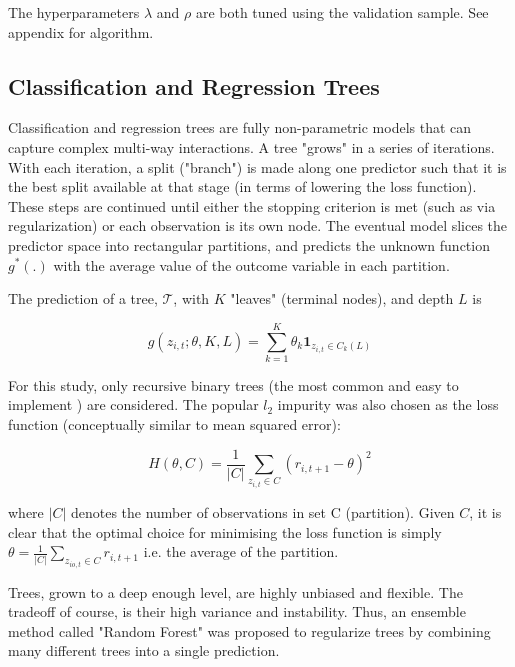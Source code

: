 \documentclass[man, a4paper, biblatex]{article}
\newcommand{\smalltodo}[2][] {\todo[caption={#2}, size=\scriptsize,%
	fancyline,#1]{\begin{spacing}{.5}#2\end{spacing}}}
\newcommand{\rhs}[2][]{\smalltodo[color=green!30,#1]{{\bf RS:} #2}}
\begin{document}
The hyperparameters $\lambda$ and $\rho$ are both tuned using the validation sample. See appendix for algorithm.

\rhs{update when algorithm is written}

\subsection{Classification and Regression Trees}

Classification and regression trees are fully non-parametric models that can capture complex multi-way interactions. A tree "grows" in a series of iterations. With each iteration, a split ("branch") is made along one predictor such that it is the best split available at that stage (in terms of lowering the loss function). These steps are continued until either the stopping criterion is met (such as via regularization) or each observation is its own node. The eventual model slices the predictor space into rectangular partitions, and predicts the unknown function $g^*(.)$ with the average value of the outcome variable in each partition.

The prediction of a tree, $\mathcal{T}$, with \(K\) "leaves" (terminal nodes), and depth $L$ is

\begin{equation}
	g(z_{i,t};\theta,K,L) = \sum_{k=1}^{K}\theta_k\textbf{1}_{z_{i,t}\in C_k(L)}
\end{equation}

For this study, only recursive binary trees (the most common and easy to implement ) are considered. The popular $l_2$ impurity was also chosen as the loss function (conceptually similar to mean squared error):

\begin{equation}
	H(\theta, C) = \frac{1}{|C|} \sum_{z_{i,t} \in C} (r_{i,t+1} - \theta)^2
\end{equation}

where $|C|$ denotes the number of observations in set C (partition). Given $C$, it is clear that the optimal choice for minimising the loss function is simply $\theta = \frac{1}{|C|} \sum_{z_{io,t}\in C}^{ }r_{i,t+1}$ i.e. the average of the partition.

Trees, grown to a deep enough level, are highly unbiased and flexible. The tradeoff of course, is their high variance and instability. Thus, an ensemble method called "Random Forest" was proposed to regularize trees by combining many different trees into a single prediction.
\end{document}
